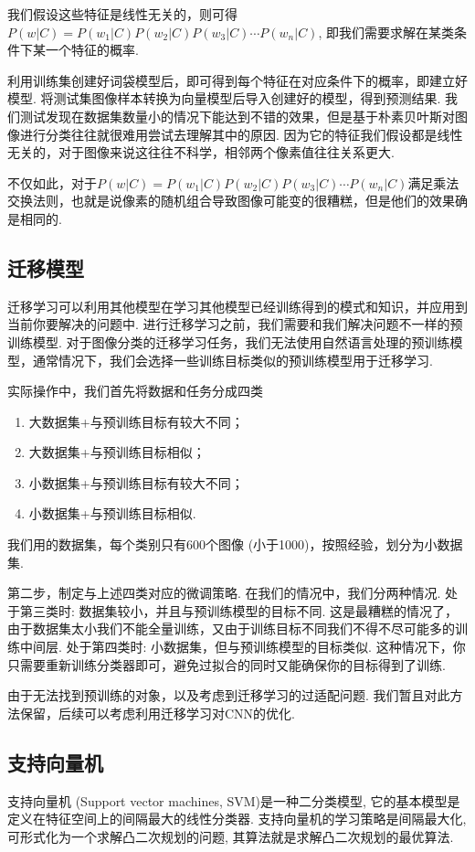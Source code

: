 \documentclass[lang=cn, 11pt,   a4paper]{elegantpaper}
\begin{document}
我们假设这些特征是线性无关的，则可得$P (w | C)=P\left (w_{1} | C\right) P\left (w_{2} | C\right) P\left (w_{3} | C\right) \cdots P\left (w_{n} | C\right)$, 即我们需要求解在某类条件下某一个特征的概率. 

利用训练集创建好词袋模型后，即可得到每个特征在对应条件下的概率，即建立好模型. 将测试集图像样本转换为向量模型后导入创建好的模型，得到预测结果. 我们测试发现在数据集数量小的情况下能达到不错的效果，但是基于朴素贝叶斯对图像进行分类往往就很难用尝试去理解其中的原因. 因为它的特征我们假设都是线性无关的，对于图像来说这往往不科学，相邻两个像素值往往关系更大. 

不仅如此，对于$P (w | C)=P\left (w_{1} | C\right) P\left (w_{2} | C\right) P\left (w_{3} | C\right) \cdots P\left (w_{n} | C\right)$满足乘法交换法则，也就是说像素的随机组合导致图像可能变的很糟糕，但是他们的效果确是相同的. 

\subsection{迁移模型}
迁移学习可以利用其他模型在学习其他模型已经训练得到的模式和知识，并应用到当前你要解决的问题中. 进行迁移学习之前，我们需要和我们解决问题不一样的预训练模型. 对于图像分类的迁移学习任务，我们无法使用自然语言处理的预训练模型，通常情况下，我们会选择一些训练目标类似的预训练模型用于迁移学习. 

实际操作中，我们首先将数据和任务分成四类
\begin{enumerate}
\item 大数据集+与预训练目标有较大不同；
\item 大数据集+与预训练目标相似；
\item 小数据集+与预训练目标有较大不同；
\item 小数据集+与预训练目标相似. 
\end{enumerate}

我们用的数据集，每个类别只有600个图像 (小于1000)，按照经验，划分为小数据集. 

第二步，制定与上述四类对应的微调策略. 在我们的情况中，我们分两种情况. 处于第三类时: 数据集较小，并且与预训练模型的目标不同. 这是最糟糕的情况了，由于数据集太小我们不能全量训练，又由于训练目标不同我们不得不尽可能多的训练中间层. 处于第四类时: 小数据集，但与预训练模型的目标类似. 这种情况下，你只需要重新训练分类器即可，避免过拟合的同时又能确保你的目标得到了训练. 

由于无法找到预训练的对象，以及考虑到迁移学习的过适配问题. 我们暂且对此方法保留，后续可以考虑利用迁移学习对CNN的优化. 

\subsection{支持向量机}
支持向量机 (Support vector machines,  SVM)是一种二分类模型, 它的基本模型是定义在特征空间上的间隔最大的线性分类器. 支持向量机的学习策略是间隔最大化, 可形式化为一个求解凸二次规划的问题, 其算法就是求解凸二次规划的最优算法. 
\end{document}
